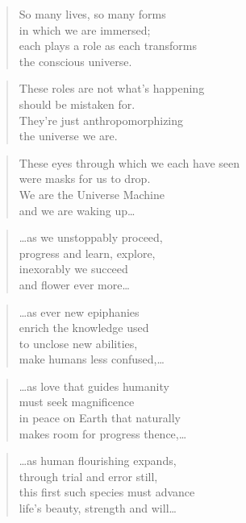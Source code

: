 \documentclass[10pt,a4paper]{article}
\begin{document}
\begin{paracol}{2}
\begin{verse}
So many lives, so many forms\\
in which we are immersed;\\
each plays a role as each transforms\\
the conscious universe.
\end{verse}

\begin{verse}
These roles are not what’s happening\\
should be mistaken for.\\
They’re just anthropomorphizing\\
the universe we are.
\end{verse}

\begin{verse}
These eyes through which we each have seen\\
were masks for us to drop.\\
We are the Universe Machine\\
and we are waking up…
\end{verse}

\begin{verse}
…as we unstoppably proceed,\\
progress and learn, explore,\\
inexorably we succeed\\
and flower ever more…
\end{verse}

\begin{verse}
…as ever new epiphanies\\
enrich the knowledge used\\
to unclose new abilities,\\
make humans less confused,…
\end{verse}

\begin{verse}
…as love that guides humanity\\
must seek magnificence\\
in peace on Earth that naturally\\
makes room for progress thence,…
\end{verse}

\begin{verse}
…as human flourishing expands,\\
through trial and error still,\\
this first such species must advance\\
life’s beauty, strength and will…
\end{verse}


\end{paracol}
\end{document}

